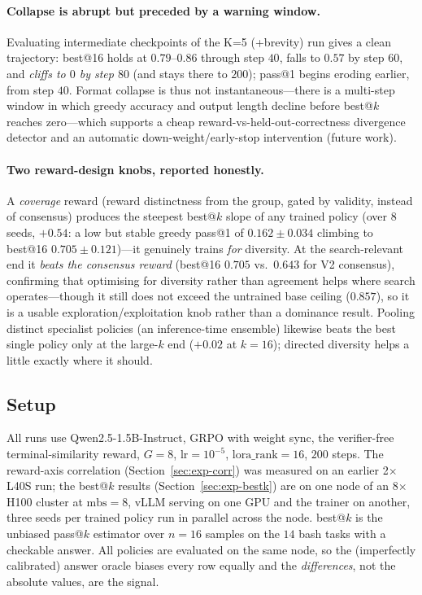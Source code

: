 \documentclass[11pt,a4paper]{article}
\begin{document}
\paragraph{Collapse is abrupt but preceded by a warning window.}
Evaluating intermediate checkpoints of the K=5 (+brevity) run gives a clean
trajectory: best@16 holds at $0.79$--$0.86$ through step $40$, falls to $0.57$ by
step $60$, and \emph{cliffs to $0$ by step $80$} (and stays there to $200$);
pass@1 begins eroding earlier, from step $40$.  Format collapse is thus not
instantaneous---there is a multi-step window in which greedy accuracy and output
length decline before best@$k$ reaches zero---which supports a cheap
reward-vs-held-out-correctness divergence detector and an automatic
down-weight/early-stop intervention (future work).

\paragraph{Two reward-design knobs, reported honestly.}
A \emph{coverage} reward (reward distinctness from the group, gated by validity,
instead of consensus) produces the steepest best@$k$ slope of any trained policy
(over 8 seeds, $+0.54$: a low but stable greedy pass@1 of $0.162\pm0.034$
climbing to best@16 $0.705\pm0.121$)---it genuinely trains \emph{for} diversity.
At the search-relevant end it \emph{beats the consensus reward} (best@16 $0.705$
vs.\ $0.643$ for V2 consensus), confirming that optimising for diversity rather
than agreement helps where search operates---though it still does not exceed the
untrained base ceiling ($0.857$), so it is a usable exploration/exploitation knob
rather than a dominance result.  Pooling distinct specialist policies (an
inference-time ensemble) likewise beats the best single policy only at the
large-$k$ end ($+0.02$ at $k{=}16$); directed diversity helps a little exactly
where it should.

\subsection{Setup}

All runs use Qwen2.5-1.5B-Instruct, GRPO with weight sync, the verifier-free
terminal-similarity reward, $G{=}8$, $\mathrm{lr}{=}10^{-5}$,
$\mathrm{lora\_rank}{=}16$, $200$ steps.  The reward-axis correlation
(Section~\ref{sec:exp-corr}) was measured on an earlier 2$\times$L40S run;
the best@$k$ results (Section~\ref{sec:exp-bestk}) are on one node of an
8$\times$H100 cluster at $\mathrm{mbs}{=}8$, vLLM serving on one GPU and the
trainer on another, three seeds per trained policy run in parallel across the
node.  best@$k$ is the unbiased pass@$k$ estimator over $n{=}16$ samples on the
$14$ bash tasks with a checkable answer.  All policies are evaluated on the same
node, so the (imperfectly calibrated) answer oracle biases every row equally and
the \emph{differences}, not the absolute values, are the signal.
\end{document}
